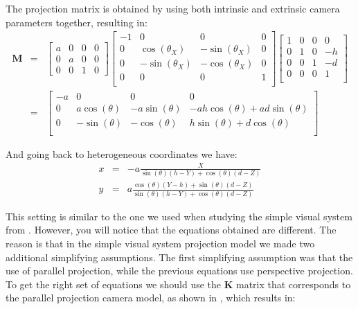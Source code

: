 The projection matrix is obtained by using both intrinsic and extrinsic camera parameters together, resulting in:
\begin{eqnarray}
    \mathbf{M} 
    &=& 
    \begin{bmatrix}
    a & 0 & 0 & 0 \\
    0 & a & 0 & 0 \\
    0 & 0 & 1 & 0
    \end{bmatrix}
    \begin{bmatrix}
    -1 & 0 & 0 & 0 \\
    0 & \cos (\theta_X) & -\sin (\theta_X)  & 0\\
    0 & -\sin (\theta_X) & -\cos (\theta_X) & 0\\
    0 & 0 & 0 & 1\\
    \end{bmatrix}
    \begin{bmatrix}
    1 & 0 & 0 & 0 \\
    0 & 1 & 0 & -h \\
    0 & 0 & 1 & -d \\
    0 & 0 & 0 & 1 \\
    \end{bmatrix}
    \nonumber \\
    &=& 
    \begin{bmatrix}
    -a & 0 & 0 & 0 \\
    0 & a\cos (\theta) & -a\sin (\theta) & -ah \cos (\theta) +ad \sin (\theta) \\
    0 & -\sin (\theta) & -\cos (\theta) & h \sin (\theta) + d \cos(\theta) \\
    \end{bmatrix}
    \label{eq:model4}
\end{eqnarray}

And going back to heterogeneous coordinates we have:
\begin{eqnarray}
x &=& -a \frac{X}{\sin( \theta ) (h-Y) + \cos ( \theta ) (d-Z)} \\
y &=& a \frac{\cos (\theta) (Y-h) + \sin(\theta) (d-Z)}{\sin( \theta ) (h-Y) + \cos ( \theta ) (d-Z)}
\end{eqnarray}

This setting is similar to the one we used when studying the simple visual system from \chap{\ref{chapter:simplesystem}}. However, you will notice that the equations obtained are different. The reason is that in the simple visual system projection model we made two additional simplifying assumptions.  The first simplifying assumption was that the use of parallel projection, while the previous equations use perspective projection. To get the right set of equations we should use the $\mathbf{K}$ matrix that corresponds to the parallel projection camera model, as shown in \eqn{\ref{eq:parallel_projection_matrix}}, which results in: 

